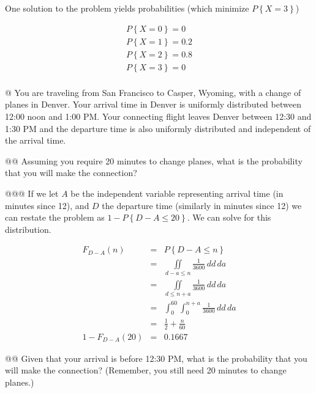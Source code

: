 \documentclass[11pt]{article}\usepackage[]{graphicx}\usepackage[]{xcolor}
\begin{document}
\begin{easylist}[enumerate]
    One solution to the problem yields probabilities (which minimize $P\left\{ X=3 \right\}$)

    \begin{equation}
        \begin{aligned}
            P\left\{ X=0 \right\} = 0\\
            P\left\{ X=1 \right\} = 0.2\\
            P\left\{ X=2 \right\} = 0.8\\
            P\left\{ X=3 \right\} = 0\\
        \end{aligned}
    \end{equation}

    @ You are traveling from San Francisco to Casper, Wyoming, with a change of planes in Denver.  Your arrival time in
    Denver is uniformly distributed between 12:00 noon and 1:00 PM. Your connecting flight leaves Denver between 12:30
    and 1:30 PM and the departure time is also uniformly distributed and independent of the arrival time.

    @@ Assuming you require 20 minutes to change planes, what is the probability that you will make the connection?

    @@@ If we let $A$ be the independent variable representing arrival time (in minutes since 12), and $D$ the departure
    time (similarly in minutes since 12) we can restate the problem as $1 - P\left\{ D - A \le 20 \right\}$. We can
    solve for this distribution.

    \begin{equation}
        \begin{aligned}
            F_{D-A}(n) &=& P\left\{ D - A \le n \right\}\\
                       &=& \iint\limits_{d - a \le n} \frac{1}{3600} \, dd \, da\\
                       &=& \iint\limits_{d \le n + a} \frac{1}{3600} \, dd \, da\\
                       &=& \int_0^{60} \int_0^{n+a} \frac{1}{3600} \, dd \, da\\
                       &=& \frac{1}{2} + \frac{n}{60}\\
       1 - F_{D-A}(20) &=& 0.1667
        \end{aligned}
    \end{equation}

    @@ Given that your arrival is before 12:30 PM, what is the probability that you will make the connection? (Remember,
    you still need 20 minutes to change planes.)


\end{easylist}
\end{document}
